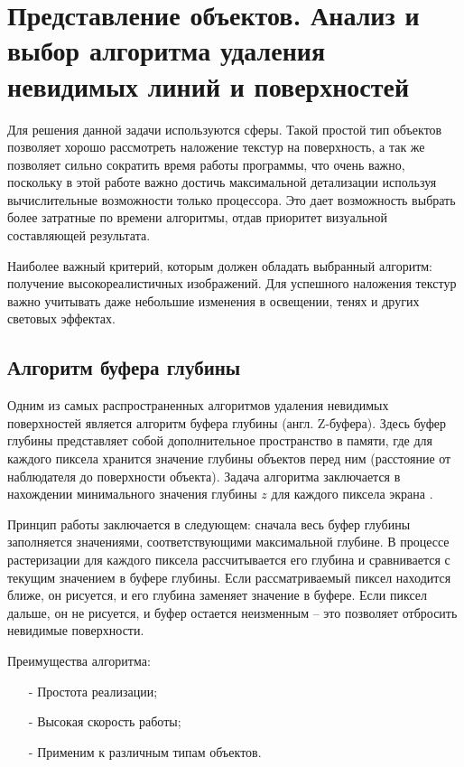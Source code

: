 \section{Представление объектов. Анализ и выбор алгоритма удаления невидимых линий и поверхностей}

Для решения данной задачи используются сферы. Такой простой тип объектов позволяет хорошо рассмотреть наложение текстур на поверхность, а так же позволяет сильно сократить время работы программы, что очень важно, поскольку в этой работе важно достичь максимальной детализации используя вычислительные возможности только процессора. Это дает возможность выбрать более затратные по времени алгоритмы, отдав приоритет визуальной составляющей результата.

Наиболее важный критерий, которым должен обладать выбранный алгоритм: получение высокореалистичных изображений. Для успешного наложения текстур важно учитывать даже небольшие изменения в освещении, тенях и других световых эффектах.

\subsection{Алгоритм буфера глубины}

Одним из самых распространенных алгоритмов удаления невидимых поверхностей является алгоритм буфера глубины (англ. Z-буфера). Здесь буфер глубины представляет собой дополнительное пространство в памяти, где для каждого пиксела хранится значение глубины объектов перед ним (расстояние от наблюдателя до поверхности объекта). Задача алгоритма заключается в нахождении минимального значения глубины $z$ для каждого пиксела экрана \cite{b2} \cite{b3}.

Принцип работы заключается в следующем: сначала весь буфер глубины заполняется значениями, соответствующими максимальной глубине. В процессе растеризации для каждого пиксела рассчитывается его глубина и сравнивается с текущим значением в буфере глубины. Если рассматриваемый пиксел находится ближе, он рисуется, и его глубина заменяет значение в буфере. Если пиксел дальше, он не рисуется, и буфер остается неизменным – это позволяет отбросить невидимые поверхности.

Преимущества алгоритма:
\begin{itemize}[label=\arabic*)]
	\item[-] Простота реализации;
	\item[-] Высокая скорость работы;
	\item[-] Применим к различным типам объектов.
\end{itemize}

